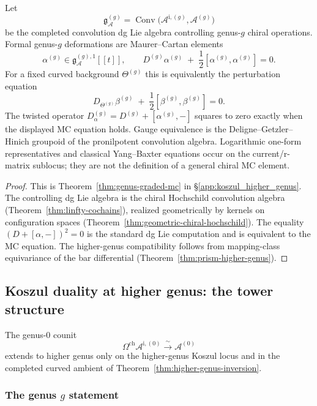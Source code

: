 \begin{theorem}
\label{thm:genus-graded-mc-appendix}
Let
\[
\mathfrak{g}^{(g)}_{\mathcal{A}}
=\operatorname{Conv}\bigl(\mathcal{A}^{\mathrm i,(g)},\mathcal{A}^{(g)}\bigr)
\]
be the completed convolution dg Lie algebra controlling genus-$g$
chiral operations. Formal genus-$g$ deformations are Maurer--Cartan
elements
\[
\alpha^{(g)}\in
\mathfrak{g}^{(g),1}_{\mathcal{A}}[[t]],
\qquad
D^{(g)}\alpha^{(g)}
\;+\;\frac{1}{2}[\alpha^{(g)},\alpha^{(g)}]=0.
\]
For a fixed curved background $\Theta^{(g)}$ this is equivalently the
perturbation equation
\[
D_{\Theta^{(g)}}\beta^{(g)}
\;+\;\frac{1}{2}[\beta^{(g)},\beta^{(g)}]=0.
\]
The twisted operator
$D^{(g)}_{\alpha}=D^{(g)}+[\alpha^{(g)},-]$ squares to zero exactly
when the displayed MC equation holds. Gauge equivalence is the
Deligne--Getzler--Hinich groupoid of the pronilpotent convolution
algebra. Logarithmic one-form representatives and classical
Yang--Baxter equations occur on the current/r-matrix sublocus; they
are not the definition of a general chiral MC element.
\end{theorem}

\begin{proof}
This is Theorem~\ref{thm:genus-graded-mc} in
\S\ref{app:koszul_higher_genus}. The controlling dg Lie algebra is
the chiral Hochschild convolution algebra
(Theorem~\ref{thm:linfty-cochains}), realized geometrically by
kernels on configuration spaces
(Theorem~\ref{thm:geometric-chiral-hochschild}). The equality
$(D+[\alpha,-])^2=0$ is the standard dg Lie computation and is
equivalent to the MC equation. The higher-genus compatibility follows
from mapping-class equivariance of the bar differential
(Theorem~\ref{thm:prism-higher-genus}).
\end{proof}

\subsection{Koszul duality at higher genus: the tower structure}
\label{app:koszul-reference-higher-genus}

The genus-$0$ counit
\[
\Omega^{\mathrm{ch}}\mathcal{A}^{\mathrm i,(0)}
\xrightarrow{\;\sim\;}
\mathcal{A}^{(0)}
\]
extends to higher genus only on the higher-genus Koszul locus and in
the completed curved ambient of Theorem~\ref{thm:higher-genus-inversion}.

\subsubsection{\texorpdfstring{The genus $g$ statement}{The genus g statement}}

